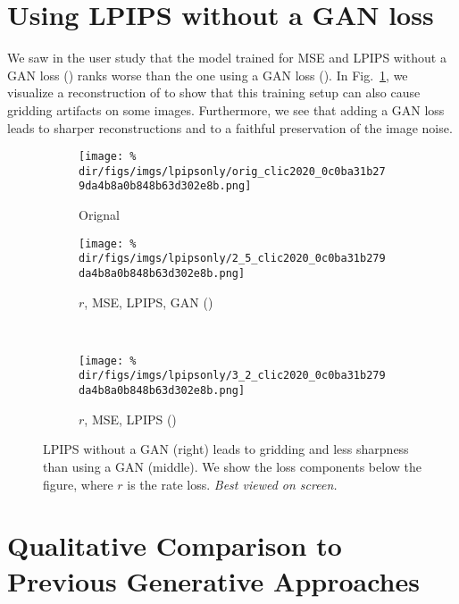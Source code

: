\begin{subappendices}
\section{Using LPIPS without a GAN loss} \label{hific:sec:suppl:lpipsonly}

We saw in the user study that the model trained for MSE and LPIPS without a GAN loss (\eblmselpips) ranks worse than the one using a GAN loss (\enamelo). In Fig.~\ref{hific:fig:lpipsonly}, we visualize a reconstruction of \eblmselpips to show that this training setup can also cause gridding artifacts on some images. Furthermore, we see that adding a GAN loss leads to sharper reconstructions and to a faithful preservation of the image noise.

\begin{figure}[h]
    \centering
\captionsetup[subfigure]{labelformat=empty,singlelinecheck=false,skip=1pt,font=small}
\begin{subfigure}[b]{.49\textwidth}
\texttt{[image: \%
    \\dir/figs/imgs/lpipsonly/orig\_clic2020\_0c0ba31b279da4b8a0b848b63d302e8b.png]}
\caption{Orignal}
\end{subfigure}
\begin{subfigure}[b]{.49\textwidth}
\texttt{[image: \%
    \\dir/figs/imgs/lpipsonly/2\_5\_clic2020\_0c0ba31b279da4b8a0b848b63d302e8b.png]}
\caption{$r$, MSE, LPIPS, GAN (\enamelo)}
\end{subfigure} \\
\textwidth
\begin{subfigure}[b]{.49\textwidth}
\texttt{[image: \%
    \\dir/figs/imgs/lpipsonly/3\_2\_clic2020\_0c0ba31b279da4b8a0b848b63d302e8b.png]}
\caption{$r$, MSE, LPIPS (\eblmselpips)}
\end{subfigure}
    \caption{\label{hific:fig:lpipsonly}LPIPS without a GAN (right) leads to gridding and less sharpness than using a GAN (middle). We show the loss components below the figure, where $r$ is the rate loss. \emph{Best viewed on screen.}}
\end{figure}

\FloatBarrier
\newpage

\section{Qualitative Comparison to Previous Generative Approaches}\label{hific:sec:previouswork}


\end{subappendices}
